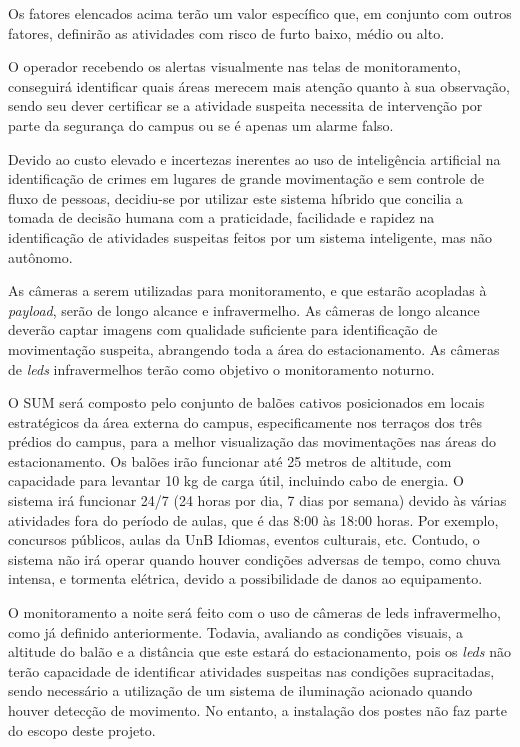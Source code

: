   Os fatores elencados acima terão um valor específico que, em conjunto com outros fatores, definirão as atividades com risco de furto baixo, médio ou alto.

  O operador recebendo os alertas visualmente nas telas de monitoramento, conseguirá identificar quais áreas merecem mais atenção quanto à sua observação, sendo seu dever certificar se a atividade suspeita necessita de intervenção por parte da segurança do campus ou se é apenas um alarme falso.

  Devido ao custo elevado e incertezas inerentes ao uso de inteligência artificial na identificação de crimes em lugares de grande movimentação e sem controle de fluxo de pessoas, decidiu-se por utilizar este sistema híbrido que concilia a tomada de decisão humana com a praticidade, facilidade e rapidez na identificação de atividades suspeitas feitos por um sistema inteligente, mas não autônomo.

  As câmeras a serem utilizadas para monitoramento, e que estarão acopladas à \emph{payload}, serão de longo alcance e infravermelho.  As câmeras de longo alcance deverão captar imagens com qualidade suficiente para identificação de movimentação suspeita, abrangendo toda a área do estacionamento. As câmeras de \emph{leds} infravermelhos terão como objetivo o monitoramento noturno.

  O SUM será composto pelo conjunto de balões cativos posicionados em locais estratégicos da área externa do campus, especificamente nos terraços dos três prédios do campus, para a melhor visualização das movimentações nas áreas do estacionamento. Os balões irão funcionar até 25 metros de altitude, com capacidade para levantar 10 kg de carga útil, incluindo cabo de energia. O sistema irá funcionar 24/7 (24 horas por dia, 7 dias por semana) devido às várias atividades fora do período de aulas, que é das 8:00 às 18:00 horas. Por exemplo, concursos públicos, aulas da UnB Idiomas, eventos culturais, etc. Contudo, o sistema não irá operar quando houver condições adversas de tempo, como chuva intensa, e tormenta elétrica, devido a possibilidade de danos ao equipamento.

  O monitoramento a noite será feito com o uso de câmeras de leds infravermelho, como já definido anteriormente. Todavia, avaliando as condições visuais, a altitude do balão e a distância que este estará do estacionamento, pois os \emph{leds} não terão capacidade  de identificar atividades suspeitas nas condições supracitadas, sendo necessário a utilização de um sistema de iluminação acionado quando houver detecção de movimento. No entanto, a instalação dos postes não faz parte do escopo deste projeto.

